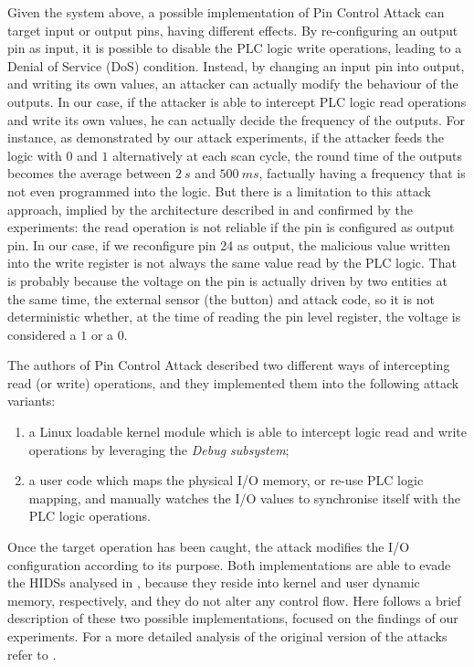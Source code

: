 Given the system above, a possible implementation of Pin Control Attack can target input or output pins, having different effects.
By re-configuring an output pin as input, it is possible to disable the PLC logic write operations, leading to a Denial of Service (DoS) condition.
Instead, by changing an input pin into output, and writing its own values, an attacker can actually modify the behaviour of the outputs.
In our case, if the attacker is able to intercept PLC logic read operations and write its own values, he can actually decide the frequency of the outputs.
For instance, as demonstrated by our attack experiments, if the attacker feeds the logic with $0$ and $1$ alternatively at each scan cycle,
the round time of the outputs becomes the average between $\SI{2}{s}$ and $\SI{500}{ms}$, factually having a frequency that is not even programmed into the logic.
But there is a limitation to this attack approach, implied by the architecture described in  and confirmed by the experiments:
the read operation is not reliable if the pin is configured as output pin. In our case, if we reconfigure pin 24 as output, the malicious value written into the write register
is not always the same value read by the PLC logic. That is probably because the voltage on the pin is actually driven by two entities at the same time,
the external sensor (the button) and attack code, so it is not deterministic whether, at the time of reading the pin level register, the voltage is considered a $1$ or a $0$.

The authors of Pin Control Attack described two different ways of intercepting read (or write) operations, and they implemented them into the following attack variants:
\begin{enumerate}
	\item a Linux loadable kernel module which is able to intercept logic read and write operations by leveraging the \emph{Debug subsystem};
	\item a user code which maps the physical I/O memory, or re-use PLC logic mapping, and manually watches the I/O values to synchronise itself with the PLC logic operations.
\end{enumerate}
Once the target operation has been caught, the attack modifies the I/O configuration according to its purpose.
Both implementations are able to evade the HIDSs analysed in , because they reside into kernel and user dynamic memory, respectively,
and they do not alter any control flow. Here follows a brief description of these two possible implementations, focused on the findings of our experiments.
For a more detailed analysis of the original version of the attacks refer to \cite{ghostplc}.


